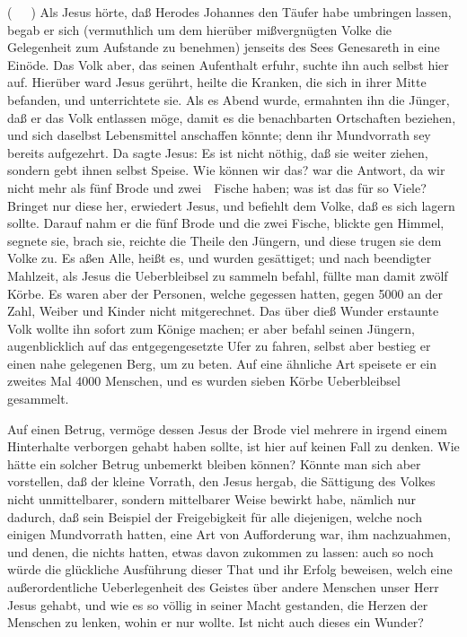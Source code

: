 \begin{aufza}
\item {} (\ \ \ ) Als Jesus hörte, daß Herodes Johannes den Täufer habe umbringen lassen, begab er sich (vermuthlich um dem hierüber mißvergnügten Volke die Gelegenheit zum Aufstande zu benehmen) jenseits des Sees Genesareth in eine Einöde. Das Volk aber, das seinen Aufenthalt erfuhr, suchte ihn auch selbst hier auf. Hierüber ward Jesus gerührt, heilte die Kranken, die sich in ihrer Mitte befanden, und unterrichtete sie. Als es Abend wurde, ermahnten ihn die Jünger, daß er das Volk entlassen möge, damit es die benachbarten Ortschaften beziehen, und sich daselbst Lebensmittel anschaffen könnte; denn ihr Mundvorrath sey bereits aufgezehrt. Da sagte Jesus: Es ist nicht nöthig, daß sie weiter ziehen, sondern gebt ihnen selbst Speise. Wie können wir das? war die Antwort, da wir nicht mehr als fünf Brode und zwei~\ Fische haben; was ist das für so Viele? Bringet nur diese her, erwiedert Jesus, und befiehlt dem Volke, daß es sich lagern sollte. Darauf nahm er die fünf Brode und die zwei Fische, blickte gen Himmel, segnete sie, brach sie, reichte die Theile den Jüngern, und diese trugen sie dem Volke zu. Es aßen Alle, heißt es, und wurden gesättiget; und nach beendigter Mahlzeit, als Jesus die Ueberbleibsel zu sammeln befahl, füllte man damit zwölf Körbe. Es waren aber der Personen, welche gegessen hatten, gegen 5000 an der Zahl, Weiber und Kinder nicht mitgerechnet. Das über dieß Wunder erstaunte Volk wollte ihn sofort zum Könige machen; er aber befahl seinen Jüngern, augenblicklich auf das entgegengesetzte Ufer zu fahren, selbst aber bestieg er einen nahe gelegenen Berg, um zu beten. Auf eine ähnliche Art speisete er ein zweites Mal 4000 Menschen, und es wurden sieben Körbe Ueberbleibsel gesammelt.\par
Auf einen Betrug, vermöge dessen Jesus der Brode viel mehrere in irgend einem Hinterhalte verborgen gehabt haben sollte, ist hier auf keinen Fall zu denken. Wie hätte ein solcher Betrug unbemerkt bleiben können? Könnte man sich aber vorstellen, daß der kleine Vorrath, den Jesus hergab, die Sättigung des Volkes nicht unmittelbarer, sondern mittelbarer Weise bewirkt habe, nämlich nur dadurch, daß sein Beispiel der Freigebigkeit für alle diejenigen, welche noch einigen Mundvorrath hatten, eine Art von Aufforderung war, ihm nachzuahmen, und denen, die nichts hatten, etwas davon zukommen zu lassen: auch so noch würde die glückliche Ausführung dieser That und ihr Erfolg beweisen, welch eine außerordentliche Ueberlegenheit des Geistes über andere Menschen unser Herr Jesus gehabt, und wie es so völlig in seiner Macht gestanden, die Herzen der Menschen zu lenken, wohin er nur wollte. Ist nicht auch dieses ein Wunder?

\end{aufza}
